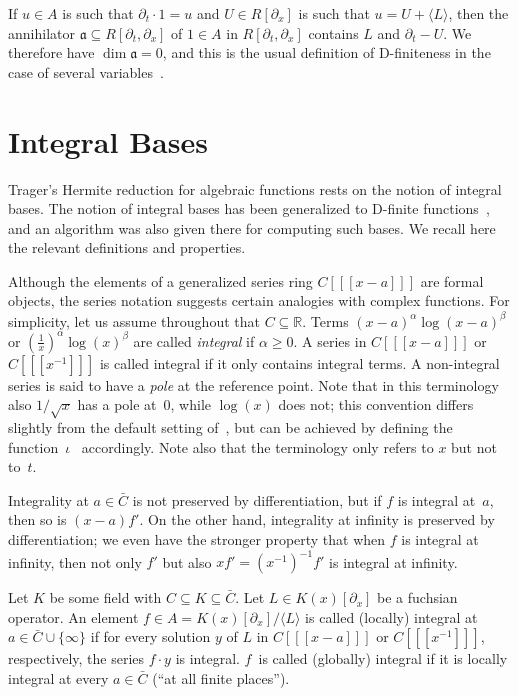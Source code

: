 \documentclass{sig-alternate}
\def\<#1>{\langle#1\rangle}
\let\set\mathbb
\begin{document}
If $u\in A$ is such that $\partial_t\cdot 1 = u$ and $U\in R[\partial_x]$ is such
that $u=U+\<L>$, then the annihilator $\mathfrak{a}\subseteq R[\partial_t,\partial_x]$
of $1\in A$ in $R[\partial_t,\partial_x]$ contains $L$ and $\partial_t-U$. We
therefore have $\dim\mathfrak{a}=0$, and this is the usual
definition of D-finiteness in the case of several variables~\cite{Zeilberger1990,chyzak98,koutschan09,kauers14c}.

\section{Integral Bases}

Trager's Hermite reduction for algebraic functions rests on the notion of
integral bases. The notion of integral bases has been generalized to D-finite
functions~\cite{kauers15b}, and an algorithm was also given there for
computing such bases. We recall here the relevant definitions and properties.

Although the elements of a generalized series ring $C[[[x-a]]]$ are formal
objects, the series notation suggests certain analogies with complex
functions.  For simplicity, let us assume throughout that $C\subseteq\set
R$. Terms $(x-a)^\alpha\log(x-a)^\beta$ or $(\tfrac1x)^\alpha\log(x)^\beta$ are
called \emph{integral} if $\alpha\geq0$. A series in
$C[[[x-a]]]$ or $C[[[x^{-1}]]]$ is called integral if it only contains integral
terms. A non-integral series is said to have a \emph{pole} at the reference
point. Note that in this terminology also $1/\sqrt{x}$ has a pole
at~$0$, while $\log(x)$ does not; this convention differs slightly from the
default setting of~\cite[Ex.~2]{kauers15b}, but can be achieved by defining
the function~$\iota$~\cite[Def.~1]{kauers15b} accordingly. Note also that
the terminology only refers to $x$ but not to~$t$.

Integrality at $a\in\bar C$ is not preserved by differentiation,
but if $f$ is integral at~$a$, then so is $(x-a)f'$. On the other hand,
integrality at infinity is preserved by differentiation; we even have the
stronger property that when $f$ is integral at infinity, then not only $f'$
but also $xf'=(x^{-1})^{-1}f'$ is integral at infinity.

Let $K$ be some field with $C\subseteq K\subseteq\bar C$.
Let $L\in K(x)[\partial_x]$ be a fuchsian operator. An element $f\in A=K(x)[\partial_x]/\<L>$
is called (locally) integral at $a\in\bar C\cup\{\infty\}$ if for every solution $y$
of $L$ in $C[[[x-a]]]$ or $C[[[x^{-1}]]]$, respectively, the series $f\cdot y$ is
integral. $f$~is called (globally) integral if it is locally integral at every
$a\in\bar C$ (``at all finite places'').
\end{document}
